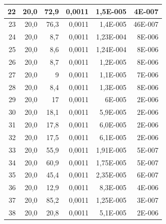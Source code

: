 \documentclass[12pt]{scrartcl}
\begin{document}
\begin{table}[H]
\begin{center}
\begin{tabular}{|r|r|r|r|r|r|}
22 & 20,0 & 72,9 & 0,0011 & 1,5E-005 & 4E-007 \\ \hline
23 & 20,0 & 76,3 & 0,0011 & 1,4E-005 & 46E-007 \\ \hline
24 & 20,0 & 8,7 & 0,0011 & 1,23E-004 & 8E-006 \\ \hline
25 & 20,0 & 8,6 & 0,0011 & 1,24E-004 & 8E-006 \\ \hline
26 & 20,0 & 8,7 & 0,0011 & 1,2E-005 & 8E-006 \\ \hline
27 & 20,0 & 9 & 0,0011 & 1,1E-005 & 7E-006 \\ \hline
28 & 20,0 & 8,4 & 0,0011 & 1,3E-005 & 8E-006 \\ \hline
29 & 20,0 & 17 & 0,0011 & 6E-005 & 2E-006 \\ \hline
30 & 20,0 & 18,1 & 0,0011 & 5,9E-005 & 2E-006 \\ \hline
31 & 20,0 & 17,8 & 0,0011 & 6,0E-005 & 2E-006 \\ \hline
32 & 20,0 & 17,5 & 0,0011 & 6,1E-005 & 2E-006 \\ \hline
33 & 20,0 & 55,9 & 0,0011 & 1,91E-005 & 5E-007 \\ \hline
34 & 20,0 & 60,9 & 0,0011 & 1,75E-005 & 5E-007 \\ \hline
35 & 20,0 & 45,4 & 0,0011 & 2,35E-005 & 6E-007 \\ \hline
36 & 20,0 & 12,9 & 0,0011 & 8,3E-005 & 4E-006 \\ \hline
37 & 20,0 & 85,2 & 0,0011 & 1,25E-005 & 3E-007 \\ \hline
38 & 20,0 & 20,8 & 0,0011 & 5,1E-005 & 2E-006 \\ \hline
\end{tabular}
\end{center}
\label{tab:messwerte_2}
\end{table}
\end{document}
